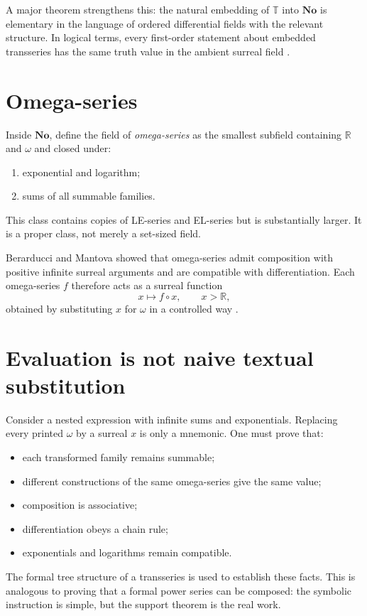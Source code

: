 \documentclass[11pt,openany]{book}
\theoremstyle{definition}
\theoremstyle{plain}
\theoremstyle{remark}
\newcommand{\R}{\mathbb{R}}
\newcommand{\T}{\mathbb{T}}
\begin{document}
A major theorem strengthens this: the natural embedding of $\T$ into $\mathbf{No}$ is elementary in the language of ordered differential fields with the relevant structure. In logical terms, every first-order statement about embedded transseries has the same truth value in the ambient surreal field \cite{adh-universal-surreal}.

\section{Omega-series}

Inside $\mathbf{No}$, define the field of \emph{omega-series} as the smallest subfield containing $\R$ and $\omega$ and closed under:
\begin{enumerate}
 \item exponential and logarithm;
 \item sums of all summable families.
\end{enumerate}
This class contains copies of LE-series and EL-series but is substantially larger. It is a proper class, not merely a set-sized field.

Berarducci and Mantova showed that omega-series admit composition with positive infinite surreal arguments and are compatible with differentiation. Each omega-series $f$ therefore acts as a surreal function
\[
 x\longmapsto f\circ x,
 \qquad x>\R,
\]
obtained by substituting $x$ for $\omega$ in a controlled way \cite{berarducci-mantova-germs}.

\section{Evaluation is not naive textual substitution}

Consider a nested expression with infinite sums and exponentials. Replacing every printed $\omega$ by a surreal $x$ is only a mnemonic. One must prove that:
\begin{itemize}
 \item each transformed family remains summable;
 \item different constructions of the same omega-series give the same value;
 \item composition is associative;
 \item differentiation obeys a chain rule;
 \item exponentials and logarithms remain compatible.
\end{itemize}
The formal tree structure of a transseries is used to establish these facts. This is analogous to proving that a formal power series can be composed: the symbolic instruction is simple, but the support theorem is the real work.
\end{document}
